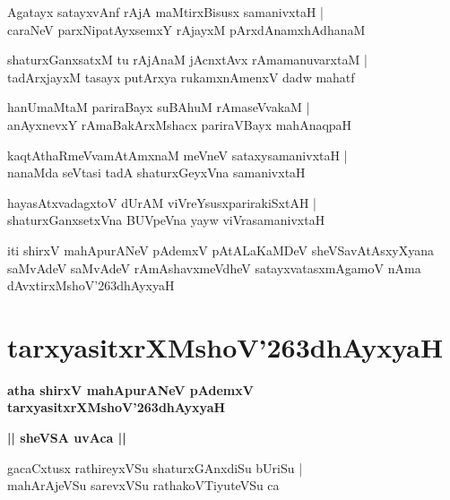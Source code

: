 \documentclass[twoside,12pt,openright]{book}
\def\S{\char'263}
\newcounter{shloka}[chapter]
\def\uvaca#1{\centerline{{\large\textbf{#1}}}}
\begin{document}
\begin{shloka}%
Agatayx satayxvAnf rAjA maMtirxBisusx samanivxtaH |\\
caraNeV parxNipatAyxsemxY rAjayxM pArxdAnamxhAdhanaM 
\end{shloka}

\begin{shloka}%
shaturxGanxsatxM tu rAjAnaM jAcnxtAvx rAmamanuvarxtaM |\\
tadArxjayxM tasayx putArxya rukamxnAmenxV dadw mahatf 
\end{shloka}

\begin{shloka}%
hanUmaMtaM pariraBayx suBAhuM rAmaseVvakaM |\\
anAyxnevxY rAmaBakArxMshacx pariraVBayx mahAnaqpaH 
\end{shloka}

\begin{shloka}%
kaqtAthaRmeVvamAtAmxnaM meVneV sataxysamanivxtaH |\\
nanaMda seVtasi tadA shaturxGeyxVna samanivxtaH 
\end{shloka}

\begin{shloka}%
hayasAtxvadagxtoV dUrAM viVreYsusxparirakiSxtAH |\\
shaturxGanxsetxVna BUVpeVna yayw viVrasamanivxtaH 
\end{shloka}

\begin{center}
iti shirxV mahApurANeV pAdemxV pAtALaKaMDeV sheVSavAtAsxyXyana saMvAdeV 
saMvAdeV rAmAshavxmeVdheV satayxvatasxmAgamoV nAma dAvxtirxMshoV\S dhAyxyaH
\end{center}

\chapter{tarxyasitxrXMshoV\S dhAyxyaH}

\begin{center}
{\LARGE\bfseries atha shirxV mahApurANeV pAdemxV tarxyasitxrXMshoV\S dhAyxyaH}
\end{center}

\uvaca{|| sheVSA uvAca ||}

\begin{shloka}%
gacaCxtusx rathireyxVSu shaturxGAnxdiSu bUriSu |\\
mahArAjeVSu sarevxVSu rathakoVTiyuteVSu ca 
\end{shloka}
\end{document}

